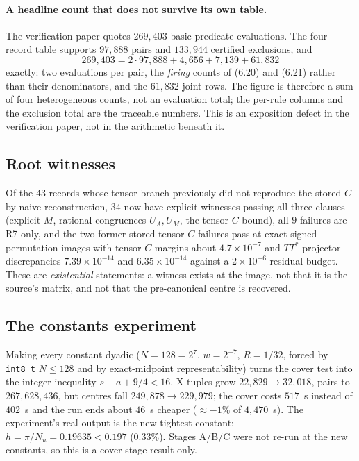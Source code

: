 \documentclass[10pt]{article}
\theoremstyle{definition}
\begin{document}
\paragraph{A headline count that does not survive its own table.} The verification paper quotes
$269{,}403$ basic-predicate evaluations. The four-record table supports $97{,}888$ pairs and
$133{,}944$ certified exclusions, and
\[269{,}403=2\cdot97{,}888+4{,}656+7{,}139+61{,}832\]
exactly: two evaluations per pair, the \emph{firing} counts of (6.20) and (6.21) rather than their
denominators, and the $61{,}832$ joint rows. The figure is therefore a sum of four heterogeneous
counts, not an evaluation total; the per-rule columns and the exclusion total are the traceable
numbers. This is an exposition defect in the verification paper, not in the arithmetic beneath it.

\subsection{Root witnesses}\label{sec:root}
Of the $43$ records whose tensor branch previously did not reproduce the stored $C$ by naive
reconstruction, $34$ now have explicit witnesses passing all three clauses (explicit $M$, rational
congruences $U_A,U_M$, the tensor-$C$ bound), all $9$ failures are R7-only, and the two former
stored-tensor-$C$ failures pass at exact signed-permutation images with tensor-$C$ margins about
$4.7\times10^{-7}$ and $TT^*$ projector discrepancies $7.39\times10^{-14}$ and
$6.35\times10^{-14}$ against a $2\times10^{-6}$ residual budget. These are \emph{existential}
statements: a witness exists at the image, not that it is the source's matrix, and not that the
pre-canonical centre is recovered.

\subsection{The constants experiment}\label{sec:const}
Making every constant dyadic ($N=128=2^7$, $w=2^{-7}$, $R=1/32$, forced by \texttt{int8\_t} $N\le128$
and by exact-midpoint representability) turns the cover test into the integer inequality
$s+a+9/4<16$. X tuples grow $22{,}829\to32{,}018$, pairs to $267{,}628{,}436$, but centres fall
$249{,}878\to229{,}979$; the cover costs $517$~s instead of $402$~s and the run ends about $46$~s
cheaper ($\approx-1\%$ of $4{,}470$~s). The experiment's real output is the new tightest constant:
$h=\pi/N_u=0.19635<0.197$ ($0.33\%$). Stages A/B/C were not re-run at the new constants, so this is a
cover-stage result only.
\end{document}
